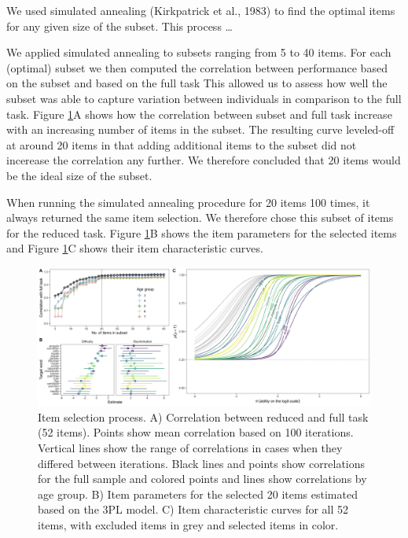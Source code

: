 \documentclass[
  man,floatsintext]{apa6}
\begin{document}
We used simulated annealing (Kirkpatrick et al., 1983) to find the optimal items for any given size of the subset. This process \ldots{}

We applied simulated annealing to subsets ranging from 5 to 40 items. For each (optimal) subset we then computed the correlation between performance based on the subset and based on the full task This allowed us to assess how well the subset was able to capture variation between individuals in comparison to the full task. Figure \ref{fig:fig4}A shows how the correlation between subset and full task increase with an increasing number of items in the subset. The resulting curve leveled-off at around 20 items in that adding additional items to the subset did not incerease the correlation any further. We therefore concluded that 20 items would be the ideal size of the subset.

When running the simulated annealing procedure for 20 items 100 times, it always returned the same item selection. We therefore chose this subset of items for the reduced task. Figure \ref{fig:fig4}B shows the item parameters for the selected items and Figure \ref{fig:fig4}C shows their item characteristic curves.



\begin{figure}

{\centering \includegraphics[width=1\linewidth]{../graphs/item_fig2} 

}

\caption{Item selection process. A) Correlation between reduced and full task (52 items). Points show mean correlation based on 100 iterations. Vertical lines show the range of correlations in cases when they differed between iterations. Black lines and points show correlations for the full sample and colored points and lines show correlations by age group. B) Item parameters for the selected 20 items estimated based on the 3PL model. C) Item characteristic curves for all 52 items, with excluded items in grey and selected items in color.}\label{fig:fig4}
\end{figure}
\end{document}
